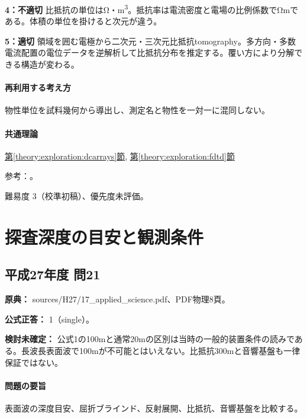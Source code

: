 \noindent\textbf{4：不適切} 比抵抗の単位はΩ・m\textsuperscript{3}。抵抗率は電流密度と電場の比例係数でΩmである。体積の単位を掛けると次元が違う。\par

\noindent\textbf{5：適切} 領域を囲む電極から二次元・三次元比抵抗tomography。多方向・多数電流配置の電位データを逆解析して比抵抗分布を推定する。覆い方により分解できる構造が変わる。\par

\paragraph{再利用する考え方} 物性単位を試料幾何から導出し、測定名と物性を一対一に混同しない。

\paragraph{共通理論} \hyperref[theory:exploration:dcarrays]{第\ref*{theory:exploration:dcarrays}節}, \hyperref[theory:exploration:fdtd]{第\ref*{theory:exploration:fdtd}節}

\par 参考：\cite{epa_resistivity,epa_fdem,epa_borehole_resistivity}。

\par 難易度 3（校準初稿）、優先度未評価。

\section{探査深度の目安と観測条件}

\subsection{平成27年度 問21}
\label{q:h27-reg-applied-21}

\noindent\textbf{原典：} sources/H27/17\_applied\_science.pdf、PDF物理8頁。

\textbf{公式正答：} 1（single）。

\par\textbf{検討未確定：} 公式1の100mと通常20mの区別は当時の一般的装置条件の読みである。長波長表面波で100mが不可能とはいえない。比抵抗300mと音響基盤も一律保証ではない。

\paragraph{問題の要旨} 表面波の深度目安、屈折ブラインド、反射展開、比抵抗、音響基盤を比較する。

